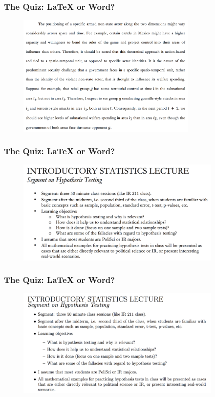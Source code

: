 \documentclass{beamer} %
\begin{document}
\begin{frame}
\frametitle{The Quiz: {\LaTeX} or Word?}
\begin{figure}[htbp]
\begin{center}
\includegraphics[width = 3.5in]{word1.pdf}
\end{center}
\end{figure}
\end{frame}
 
\begin{frame}
\frametitle{The Quiz: {\LaTeX} or Word?}
\begin{figure}[htbp]
\begin{center}
\includegraphics[width = 4in]{word2.pdf}
\end{center}
\end{figure}
\end{frame}

\begin{frame}
\frametitle{The Quiz: {\LaTeX} or Word?}
\begin{figure}[htbp]
\begin{center}
\includegraphics[width = 4in]{latex2.pdf}
\end{center}
\end{figure}
\end{frame}
\end{document}

